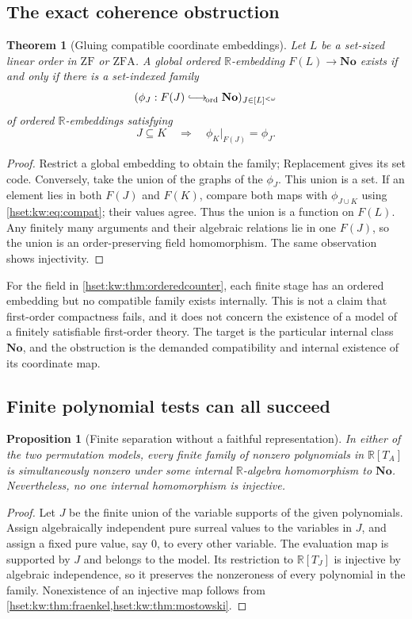 \documentclass[11pt,letterpaper]{article}
\newtheorem{theorem}{Theorem}[section]
\newtheorem{proposition}[proposition]{Proposition}\aliascntresetthe{proposition}
\theoremstyle{definition}
\theoremstyle{remark}
\newcommand{\No}{\mathbf{No}}
\newcommand{\ZF}{\mathrm{ZF}}
\newcommand{\ZFA}{\mathrm{ZFA}}
\newcommand{\R}{\mathbb R}
\newcommand{\hookord}{\mathrel{\lhook\joinrel\longrightarrow_{\!\mathrm{ord}}}}
\begin{document}
\subsection{The exact coherence obstruction}
\begin{theorem}[Gluing compatible coordinate embeddings]\label{hset:kw:thm:coherence}
Let $L$ be a set-sized linear order in $\ZF$ or $\ZFA$. A global ordered $\R$-embedding $F(L)\to\No$ exists if and only if there is a set-indexed family
\[
(\phi_J:F(J)\hookord\No)_{J\in[L]^{<\omega}}
\]
of ordered $\R$-embeddings satisfying
\begin{equation}\label{hset:kw:eq:compat}
J\subseteq K\quad\Longrightarrow\quad\phi_K|_{F(J)}=\phi_J.
\end{equation}
\end{theorem}
\begin{proof}
Restrict a global embedding to obtain the family; Replacement gives its set code. Conversely, take the union of the graphs of the $\phi_J$. This union is a set. If an element lies in both $F(J)$ and $F(K)$, compare both maps with $\phi_{J\cup K}$ using \eqref{hset:kw:eq:compat}; their values agree. Thus the union is a function on $F(L)$. Any finitely many arguments and their algebraic relations lie in one $F(J)$, so the union is an order-preserving field homomorphism. The same observation shows injectivity.
\end{proof}

For the field in \cref{hset:kw:thm:orderedcounter}, each finite stage has an ordered embedding but no compatible family exists internally. This is not a claim that first-order compactness fails, and it does not concern the existence of a model of a finitely satisfiable first-order theory. The target is the particular internal class $\No$, and the obstruction is the demanded compatibility and internal existence of its coordinate map.

\subsection{Finite polynomial tests can all succeed}
\begin{proposition}[Finite separation without a faithful representation]\label{hset:kw:prop:finite-separation}
In either of the two permutation models, every finite family of nonzero polynomials in $\R[T_A]$ is simultaneously nonzero under some internal $\R$-algebra homomorphism to $\No$. Nevertheless, no one internal homomorphism is injective.
\end{proposition}
\begin{proof}
Let $J$ be the finite union of the variable supports of the given polynomials. Assign algebraically independent pure surreal values to the variables in $J$, and assign a fixed pure value, say $0$, to every other variable. The evaluation map is supported by $J$ and belongs to the model. Its restriction to $\R[T_J]$ is injective by algebraic independence, so it preserves the nonzeroness of every polynomial in the family. Nonexistence of an injective map follows from \cref{hset:kw:thm:fraenkel,hset:kw:thm:mostowski}.
\end{proof}
\end{document}

